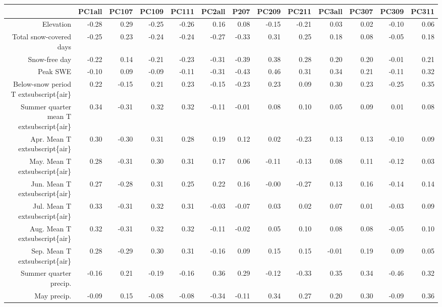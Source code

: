 \begin{table}[ht]
\centering
\begin{tabular}{rrrrrrrrrrrrr}
  \hline
 & PC1all & PC107 & PC109 & PC111 & PC2all & P207 & PC209 & PC211 & PC3all & PC307 & PC309 & PC311 \\ 
  \hline
Elevation & -0.28 & 0.29 & -0.25 & -0.26 & 0.16 & 0.08 & -0.15 & -0.21 & 0.03 & 0.02 & -0.10 & 0.06 \\ 
  Total snow-covered days & -0.25 & 0.23 & -0.24 & -0.24 & -0.27 & -0.33 & 0.31 & 0.25 & 0.18 & 0.08 & -0.05 & 0.18 \\ 
  Snow-free day & -0.22 & 0.14 & -0.21 & -0.23 & -0.31 & -0.39 & 0.38 & 0.28 & 0.20 & 0.20 & -0.01 & 0.21 \\ 
  Peak SWE & -0.10 & 0.09 & -0.09 & -0.11 & -0.31 & -0.43 & 0.46 & 0.31 & 0.34 & 0.21 & -0.11 & 0.32 \\ 
  Below-snow period T	extsubscript\{air\} & 0.22 & -0.15 & 0.21 & 0.23 & -0.15 & -0.23 & 0.23 & 0.09 & 0.30 & 0.23 & -0.25 & 0.35 \\ 
  Summer quarter mean T	extsubscript\{air\} & 0.34 & -0.31 & 0.32 & 0.32 & -0.11 & -0.01 & 0.08 & 0.10 & 0.05 & 0.09 & 0.01 & 0.08 \\ 
  Apr. Mean T	extsubscript\{air\} & 0.30 & -0.30 & 0.31 & 0.28 & 0.19 & 0.12 & 0.02 & -0.23 & 0.13 & 0.13 & -0.10 & 0.09 \\ 
  May. Mean T	extsubscript\{air\} & 0.28 & -0.31 & 0.30 & 0.31 & 0.17 & 0.06 & -0.11 & -0.13 & 0.08 & 0.11 & -0.12 & 0.03 \\ 
  Jun. Mean T	extsubscript\{air\} & 0.27 & -0.28 & 0.31 & 0.25 & 0.22 & 0.16 & -0.00 & -0.27 & 0.13 & 0.16 & -0.14 & 0.14 \\ 
  Jul. Mean T	extsubscript\{air\} & 0.33 & -0.31 & 0.32 & 0.31 & -0.03 & -0.07 & 0.03 & 0.02 & 0.07 & 0.01 & -0.03 & 0.09 \\ 
  Aug. Mean T	extsubscript\{air\} & 0.32 & -0.31 & 0.32 & 0.32 & -0.11 & -0.02 & 0.05 & 0.10 & 0.08 & 0.08 & -0.05 & 0.10 \\ 
  Sep. Mean T	extsubscript\{air\} & 0.28 & -0.29 & 0.30 & 0.31 & -0.16 & 0.09 & 0.15 & 0.15 & -0.01 & 0.19 & 0.09 & 0.05 \\ 
  Summer quarter precip. & -0.16 & 0.21 & -0.19 & -0.16 & 0.36 & 0.29 & -0.12 & -0.33 & 0.35 & 0.34 & -0.46 & 0.32 \\ 
  May precip. & -0.09 & 0.15 & -0.08 & -0.08 & -0.34 & -0.11 & 0.34 & 0.27 & 0.20 & 0.30 & -0.09 & 0.36 \\ 

\end{tabular}
\end{table}
